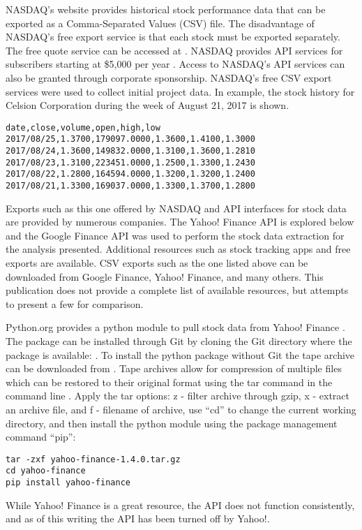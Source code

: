 \documentclass[sigconf]{acmart}
\begin{document}
NASDAQ's website provides historical stock performance data that can be exported as a Comma-Separated Values (CSV) file. The disadvantage of NASDAQ's free export service is that each stock must be exported separately. The free quote service can be accessed at \cite{www-quotenasdaq}. NASDAQ provides API services for subscribers starting at \$5,000 per year \cite{www-nasdaq-sub}. Access to NASDAQ's API services can also be granted through corporate sponsorship. NASDAQ's free CSV export services were used to collect initial project data. In example, the stock history for Celsion Corporation during the week of August 21, 2017 is shown.

\begin{mdframed}[style=default]
\begin{lstlisting}
date,close,volume,open,high,low
2017/08/25,1.3700,179097.0000,1.3600,1.4100,1.3000
2017/08/24,1.3600,149832.0000,1.3100,1.3600,1.2810
2017/08/23,1.3100,223451.0000,1.2500,1.3300,1.2430
2017/08/22,1.2800,164594.0000,1.3200,1.3200,1.2400
2017/08/21,1.3300,169037.0000,1.3300,1.3700,1.2800
\end{lstlisting}
\end{mdframed} 

Exports such as this one offered by NASDAQ and API interfaces for stock data are provided by numerous companies. The Yahoo! Finance API is explored below and the Google Finance API was used to perform the stock data extraction for the analysis presented. Additional resources such as stock tracking apps and free exports are available. CSV exports such as the one listed above can be downloaded from Google Finance, Yahoo! Finance, and many others. This publication does not provide a complete list of available resources, but attempts to present a few for comparison. 

Python.org provides a python module to pull stock data from Yahoo! Finance \cite{www-python-yahoo}. The package can be installed through Git by cloning the Git directory where the package is available: \cite{www-yahooStock}. To install the python package without Git the tape archive can be downloaded from \cite{www-pythonYahooStock}.  Tape archives allow for compression of multiple files which can be restored to their original format using the tar command in the command line \cite{www-tar}.  Apply the tar options: z - filter archive through gzip, x - extract an archive file, and f - filename of archive, use ``cd'' to change the current working directory, and then install the python module using the package management command ``pip'':
\begin{mdframed}[style=default]
\begin{lstlisting}
tar -zxf yahoo-finance-1.4.0.tar.gz
cd yahoo-finance
pip install yahoo-finance
\end{lstlisting}
\end{mdframed}
While Yahoo! Finance is a great resource, the API does not function consistently, and as of this writing the API has been turned off by Yahoo!.
\end{document}
